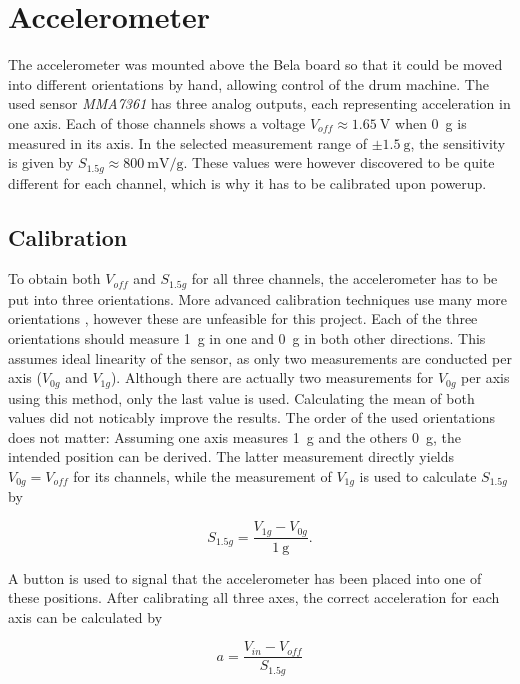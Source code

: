 \documentclass[a4paper, 12pt]{article}
\begin{document}
\section{Accelerometer}
The accelerometer was mounted above the Bela board so that it could be moved into different orientations by hand, allowing control of the drum machine. The used sensor \emph{MMA7361} \cite{Freescale2008} has three analog outputs, each representing acceleration in one axis. Each of those channels shows a voltage $V_{off} \approx \SI{1.65}{\volt}$ when \SI{0}{\gram} is measured in its axis. In the selected measurement range of $\pm \SI{1.5}{\gram}$, the sensitivity is given by $S_{1.5g} \approx \SI{800}{\milli\volt\per\gram}$. These values were however discovered to be quite different for each channel, which is why it has to be calibrated upon powerup. 

\subsection{Calibration} \label{sec:calibration}
To obtain both $V_{off}$ and $S_{1.5g}$ for all three channels, the accelerometer has to be put into three orientations. More advanced calibration techniques use many more orientations \cite{Sipos2012}, however these are unfeasible for this project. Each of the three orientations should measure \SI{+1}{\gram} in one and \SI{0}{\gram} in both other directions. This assumes ideal linearity of the sensor, as only two measurements are conducted per axis ($V_{0g}$ and $V_{1g}$). Although there are actually two measurements for $V_{0g}$ per axis using this method, only the last value is used. Calculating the mean of both values did not noticably improve the results. The order of the used orientations does not matter: Assuming one axis measures \SI{+1}{\gram} and the others \SI{0}{\gram}, the intended position can be derived. The latter measurement directly yields $V_{0g} = V_{off}$ for its channels, while the measurement of $V_{1g}$ is used to calculate $S_{1.5g}$ by

\begin{equation}
	S_{1.5g} = \frac{V_{1g} - V_{0g}}{\SI{1}{\gram}}.
\end{equation}

A button is used to signal that the accelerometer has been placed into one of these positions. After calibrating all three axes, the correct acceleration for each axis can be calculated by

\begin{equation}
	a = \frac{V_{in} - V_{off}}{S_{1.5g}}
\end{equation}
\end{document}
